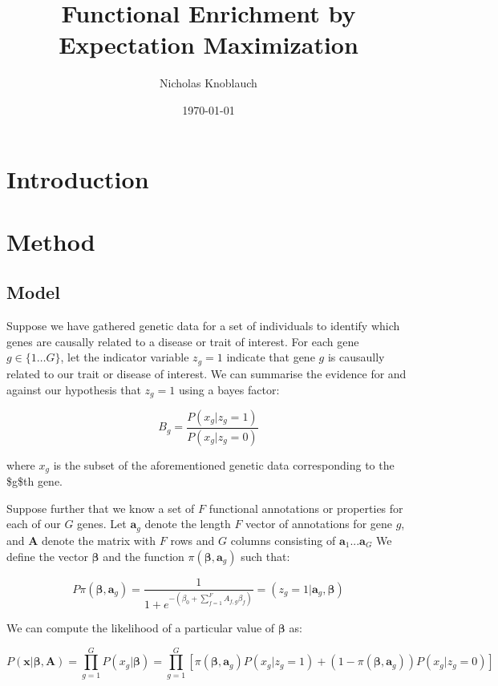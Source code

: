 \documentclass[11pt]{article}
\author{Nicholas Knoblauch}
\date{\today}
\title{Functional Enrichment by Expectation Maximization}
\begin{document}
\maketitle
\setcounter{tocdepth}{2}
\tableofcontents


\section*{Introduction}
\label{sec:org37f1ee5}

\section*{Method}
\label{sec:org9bf8fc0}

\subsection*{Model}
\label{sec:orgfc60147}

Suppose we have gathered genetic data for a set of individuals to identify which genes are causally related to a disease or trait of interest.  For each gene \(g \in \{1 \dots G\}\), let the indicator variable \(z_g=1\) indicate that
gene \(g\) is causaully related to our trait or disease of interest.  We can summarise the evidence for and against our hypothesis that \(z_g=1\) using a bayes factor:

$$B_g=\frac{P(x_g|z_g=1)}{P(x_g|z_g=0)}$$

where \(x_g\) is the subset of the aforementioned genetic data corresponding to the \$g\$th gene.

Suppose further that we know a set of \(F\) functional annotations or properties for each of our \(G\) genes.  Let \(\textbf{a}_g\) denote the length \(F\) vector of annotations for gene \(g\), and \(\textbf{A}\) denote the matrix with \(F\) rows and \(G\) 
columns consisting of \(\textbf{a}_1 ...  \textbf{a}_G\)
We define the vector \(\boldsymbol{\beta}\) and the function \(\pi(\boldsymbol{\beta},\textbf{a}_g)\) such that:

$$P\pi(\boldsymbol{\beta},\textbf{a}_g) =  \frac{1}{1+e^{-(\beta_{0}+\sum_{f=1}^F{A_{f,g}\beta_f})}} =  (z_g=1|\textbf{a}_g,\boldsymbol{\beta})$$

We can compute the likelihood of a particular value of \(\boldsymbol{\beta}\) as:

$$ P(\textbf{x}|\boldsymbol{\beta},\textbf{A})=\prod_{g=1}^{G}P(x_g|\boldsymbol{\beta})=\prod_{g=1}^{G}[\pi(\boldsymbol{\beta},\textbf{a}_g) P(x_g|z_g=1)+(1-\pi(\boldsymbol{\beta},\textbf{a}_g))P(x_g|z_g=0)]$$
\end{document}
